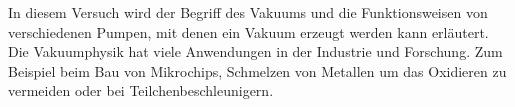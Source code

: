 In diesem Versuch wird der Begriff des Vakuums und die Funktionsweisen von verschiedenen Pumpen, mit denen ein Vakuum erzeugt werden kann erläutert. Die Vakuumphysik hat viele Anwendungen in der Industrie und Forschung. Zum Beispiel beim Bau von Mikrochips, Schmelzen von Metallen um das Oxidieren zu vermeiden oder bei Teilchenbeschleunigern.